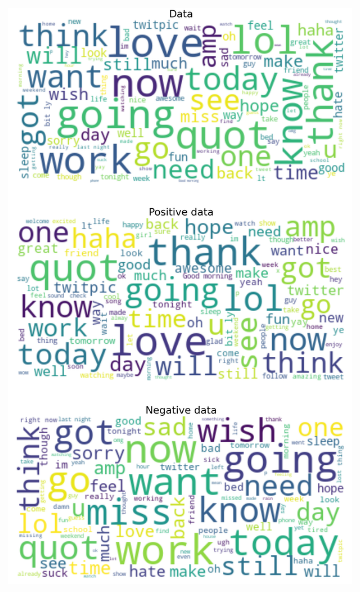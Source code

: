 \documentclass{article}
\begin{document}
\begin{itemize}
\begin{figure}[H]
\centering
\captionsetup{justification=centering}
\begin{subfigure}[b]{0.24\textwidth}
\centering
\includegraphics[width=\textwidth]{chapter-06/section-01-01/01/visualization/1/wordcloud.png}
\end{subfigure}
\begin{subfigure}[b]{0.24\textwidth}
\centering

\end{subfigure}
\end{figure}
\end{itemize}
\end{document}
